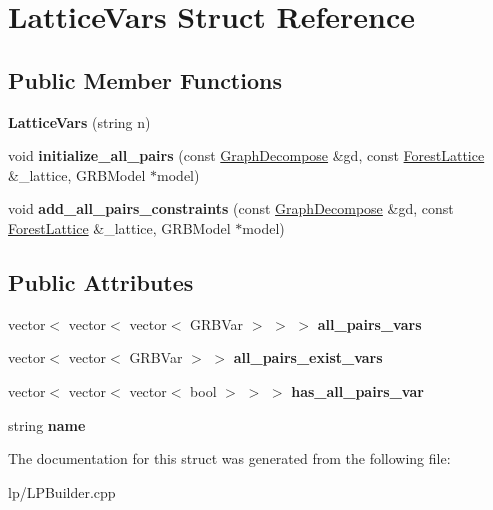 \hypertarget{structLatticeVars}{
\section{LatticeVars Struct Reference}
\label{structLatticeVars}
}
\subsection*{Public Member Functions}
\begin{DoxyCompactItemize}
\item 
\hypertarget{structLatticeVars_a6b23de096157f037cd23f50eb46d7dff}{
{\bfseries LatticeVars} (string n)}
\label{structLatticeVars_a6b23de096157f037cd23f50eb46d7dff}

\item 
\hypertarget{structLatticeVars_af741becdc44e834766251e3265a68bae}{
void {\bfseries initialize\_\-all\_\-pairs} (const \hyperlink{classGraphDecompose}{GraphDecompose} \&gd, const \hyperlink{classForestLattice}{ForestLattice} \&\_\-lattice, GRBModel $\ast$model)}
\label{structLatticeVars_af741becdc44e834766251e3265a68bae}

\item 
\hypertarget{structLatticeVars_a7580d7ddc3ea9cce8ddc28816f6dc86a}{
void {\bfseries add\_\-all\_\-pairs\_\-constraints} (const \hyperlink{classGraphDecompose}{GraphDecompose} \&gd, const \hyperlink{classForestLattice}{ForestLattice} \&\_\-lattice, GRBModel $\ast$model)}
\label{structLatticeVars_a7580d7ddc3ea9cce8ddc28816f6dc86a}

\end{DoxyCompactItemize}
\subsection*{Public Attributes}
\begin{DoxyCompactItemize}
\item 
\hypertarget{structLatticeVars_a578fc35f60c10a6f6e1080c3db356789}{
vector$<$ vector$<$ vector$<$ GRBVar $>$ $>$ $>$ {\bfseries all\_\-pairs\_\-vars}}
\label{structLatticeVars_a578fc35f60c10a6f6e1080c3db356789}

\item 
\hypertarget{structLatticeVars_a4a6f5646f7521349ea8aec596dff5fbf}{
vector$<$ vector$<$ GRBVar $>$ $>$ {\bfseries all\_\-pairs\_\-exist\_\-vars}}
\label{structLatticeVars_a4a6f5646f7521349ea8aec596dff5fbf}

\item 
\hypertarget{structLatticeVars_a9e138da2693d87fff7d1837a0ecd43cb}{
vector$<$ vector$<$ vector$<$ bool $>$ $>$ $>$ {\bfseries has\_\-all\_\-pairs\_\-var}}
\label{structLatticeVars_a9e138da2693d87fff7d1837a0ecd43cb}

\item 
\hypertarget{structLatticeVars_a55114208b586da0b590aef02139c7d6e}{
string {\bfseries name}}
\label{structLatticeVars_a55114208b586da0b590aef02139c7d6e}

\end{DoxyCompactItemize}


The documentation for this struct was generated from the following file:\begin{DoxyCompactItemize}
\item 
lp/LPBuilder.cpp\end{DoxyCompactItemize}
